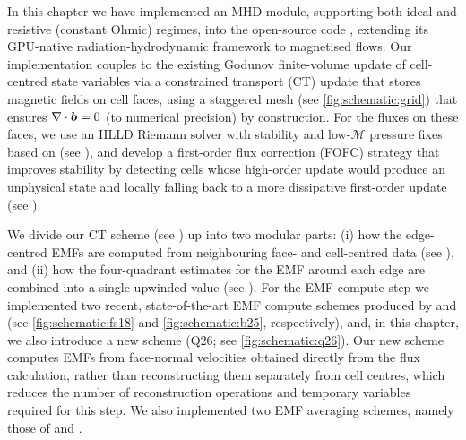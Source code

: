 In this chapter we have implemented an MHD module, supporting both ideal and resistive (constant Ohmic) regimes, into the open-source code \quokka, extending its GPU-native radiation-hydrodynamic framework to magnetised flows. Our implementation couples to the existing Godunov finite-volume update of cell-centred state variables via a constrained transport (CT) update that stores magnetic fields on cell faces, using a staggered mesh
(see \cref{fig:schematic:grid}) that ensures $\nabla\cdot\bm{b} = 0$ (to numerical precision) by construction. For the fluxes on these faces, we use an HLLD Riemann solver with stability and low-$\mathcal{M}$ pressure fixes based on \citet{Minoshima21a} (see ), and develop a first-order flux correction (FOFC) strategy that improves stability by detecting cells whose high-order update would produce an unphysical state and locally falling back to a more dissipative first-order update (see ).

We divide our CT scheme (see ) up into two modular parts: (i) how the edge-centred EMFs are computed from neighbouring face- and cell-centred data (see ), and (ii) how the four-quadrant estimates for the EMF around each edge are combined into a single upwinded value (see ). For the EMF compute step we implemented two recent, state-of-the-art EMF compute schemes produced by  and  (see \cref{fig:schematic:fs18} and \ref{fig:schematic:b25}, respectively), and, in this chapter, we also introduce a new scheme (Q26; see \cref{fig:schematic:q26}). Our new scheme computes EMFs from face-normal velocities obtained directly from the flux calculation, rather than reconstructing them separately from cell centres, which reduces the number of reconstruction operations and temporary variables required for this step. We also implemented two EMF averaging schemes, namely those of  and .

